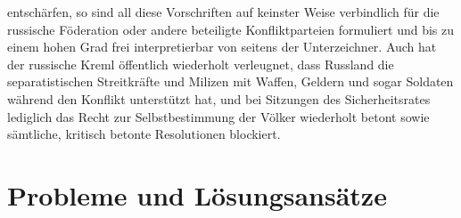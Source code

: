 \documentclass[a4paper,11pt]{article}
\begin{document}
entschärfen, so sind all diese Vorschriften auf keinster Weise verbindlich für die russische Föderation oder andere beteiligte Konfliktparteien formuliert und bis zu einem hohen Grad frei interpretierbar von seitens der Unterzeichner. Auch hat der russische Kreml öffentlich wiederholt verleugnet, dass Russland die separatistischen Streitkräfte und Milizen mit Waffen, Geldern und sogar Soldaten während den Konflikt unterstützt hat, und bei Sitzungen des Sicherheitsrates lediglich das Recht zur Selbstbestimmung der Völker wiederholt betont sowie sämtliche, kritisch betonte Resolutionen blockiert. 

  \newpage
    
    \section{Probleme und Lösungsansätze}
\end{document}
